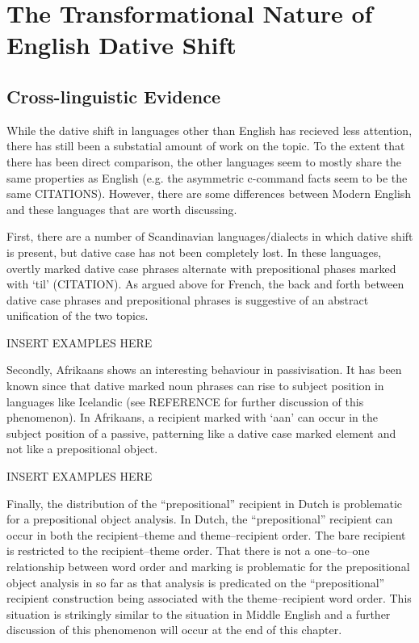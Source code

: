 \documentclass[11pt]{upenndiss}
\begin{document}
\chapter{The Transformational Nature of English Dative Shift}
\section{Cross-linguistic Evidence}
While the dative shift in languages other than English has recieved less attention, there has still been a substatial amount of work on the topic. To the extent that there has been direct comparison, the other languages seem to mostly share the same properties as English (e.g. the asymmetric c-command facts seem to be the same CITATIONS). However, there are some differences between Modern English and these languages that are worth discussing.

First, there are a number of Scandinavian languages/dialects in which dative shift is present, but dative case has not been completely lost. In these languages, overtly marked dative case phrases alternate with prepositional phases marked with `til' (CITATION). As argued above for French, the back and forth between dative case phrases and prepositional phrases is suggestive of an abstract unification of the two topics.

INSERT EXAMPLES HERE

Secondly, Afrikaans shows an interesting behaviour in passivisation. It has been known since \cite{Zaenen.1985} that dative marked noun phrases can rise to subject position in languages like Icelandic (see REFERENCE for further discussion of this phenomenon). In Afrikaans, a recipient marked with `aan' can occur in the subject position of a passive, patterning like a dative case marked element and not like a prepositional object.

INSERT EXAMPLES HERE

Finally, the distribution of the ``prepositional'' recipient in Dutch is problematic for a prepositional object analysis. In Dutch, the ``prepositional'' recipient can occur in both the recipient--theme and theme--recipient order. The bare recipient is restricted to the recipient--theme order. That there is not a one--to--one relationship between word order and marking is problematic for the prepositional object analysis in so far as that analysis is predicated on the ``prepositional'' recipient construction being associated with the theme--recipient word order. This situation is strikingly similar to the situation in Middle English and a further discussion of this phenomenon will occur at the end of this chapter.
\end{document}
